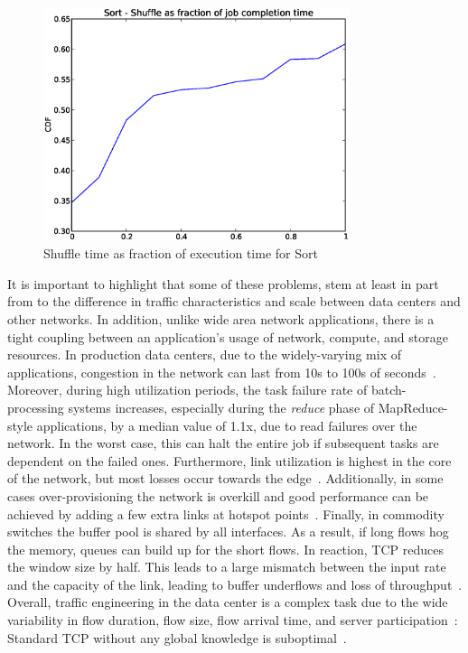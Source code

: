 \documentclass[a4paper,12pt,twoside,openright]{report}
\begin{document}
\begin{figure}[h!]
  \centering
    \includegraphics[width=0.8\textwidth]{sort_fraction.eps}
    \caption{Shuffle time as fraction of execution time for Sort}
    \label{chap:introduction:fig:sort_fraction}
\end{figure}

It is important to highlight that some of these problems, stem at least in part
from to the difference in traffic characteristics and scale between data centers
and other networks. In addition, unlike wide area network applications, there is
a tight coupling between an application's usage of network, compute, and storage
resources. In production data centers, due to the widely-varying mix of
applications, congestion in the network can last from 10s to 100s of
seconds~\cite{Kandula:2009:NDC}. Moreover, during high utilization periods, the
task failure rate of batch-processing systems increases, especially during the
\emph{reduce} phase of MapReduce-style applications, by a median value of 1.1x,
due to read failures over the network. In the worst case, this can halt the
entire job if subsequent tasks are dependent on the failed ones. Furthermore,
link utilization is highest in the core of the network, but most losses occur
towards the edge~\cite{Benson:2010:NTC}. Additionally, in some cases
over-provisioning the network is overkill and good performance can be achieved
by adding a few extra links at hotspot points~\cite{Kandula:2009:FTD}. Finally,
in commodity switches the buffer pool is shared by all interfaces. As a result,
if long flows hog the memory, queues can build up for the short flows.
In reaction, TCP reduces the window size by half. This leads to a large mismatch
between the input rate and the capacity of the link, leading to buffer
underflows and loss of throughput~\cite{Alizadeh:2010:DCT}. Overall, traffic
engineering in the data center is a complex task due to the wide variability in
flow duration, flow size, flow arrival time, and server
participation~\cite{Kandula:2009:NDC}: Standard TCP without any global knowledge
is suboptimal~\cite{Benson:2010:CFT}.
\end{document}
